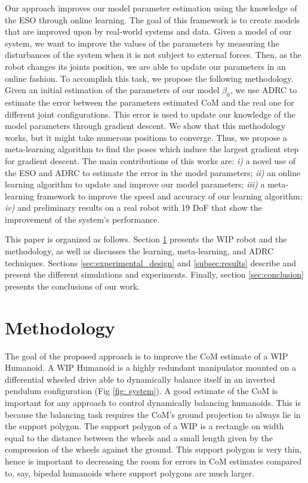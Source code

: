 \documentclass[letterpaper, 10 pt, conference]{ieeeconf}
\begin{document}
Our approach improves our model parameter estimation using the knowledge of the
\ac{ESO} through online learning.
The goal of this framework is to create models that are improved upon by
real-world systems and data. %
Given a model of our system, we want to improve the values of the parameters by
measuring the disturbances of the system when it is not subject to external
forces. Then, as the robot changes its joints position, we are able to update
our parameters in an online fashion.
To accomplish this task, we propose the following methodology. Given an initial
estimation of the parameters of our model $\beta_0$, we use \ac{ADRC}
\cite{Gao2006} to estimate the error between the parameters estimated \ac{CoM}
and the real one for different joint configurations. This error is used to
update our knowledge of the model parameters through gradient descent. We show
that this methodology works, but it might take numerous positions to converge.
Thus, we propose a meta-learning algorithm to find the poses which induce the
largest gradient step for gradient descent.
The main contributions of this works are: \textit{i)} a novel use of the
\ac{ESO} and \ac{ADRC} to estimate the error in the model parameters;
\textit{ii)} an online learning algorithm to update and improve our model
parameters; \textit{iii)} a meta-learning framework to improve the speed and
accuracy of our learning algorithm; \textit{iv)} and  preliminary results on a
real robot with 19 \ac{DoF} that show the improvement of the system's
performance.

This paper is organized as follows. Section \ref{sec:method} presents the
\ac{WIP} robot and the methodology, as well as discusses the learning,
meta-learning, and \ac{ADRC} techniques. Sections \ref{sec:experimental_design}
and \ref{subsec:results} describe and present the different simulations and
experiments. Finally, section \ref{sec:conclusion} presents the conclusions of
our work.

\section{Methodology}
\label{sec:method}

The goal of the proposed approach is to improve the \ac{CoM} estimate of a
\ac{WIP} Humanoid. A \ac{WIP} Humanoid is a highly redundant manipulator mounted
on a differential wheeled drive able to dynamically balance itself in an
inverted pendulum configuration (Fig \ref{fig: system}). A good estimate of the
\ac{CoM} is important for any approach to control dynamically balancing
humanoids. This is because the balancing task requires the \ac{CoM}'s ground
projection to always lie in the support polygon. The support polygon of a WIP is
a rectangle on width equal to the distance between the wheels and a small length
given by the compression of the wheels against the ground. This support polygon
is very thin, hence is important to decreasing the room for errors in \ac{CoM}
estimates compared to, say, bipedal humanoids where support polygons are much
larger.
\end{document}

